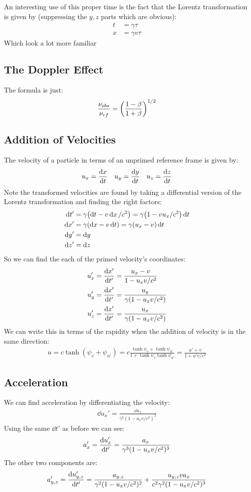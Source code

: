 \documentclass[12pt]{article}
\begin{document}
An interesting use of this proper time is the fact that the Lorentz transformation is given by (suppressing the $y,z$ parts which are obvious):
\begin{align*}
  t&=\gamma\tau\\
  x&=\gamma v\tau
\end{align*}
Which look a lot more familiar
\subsection{The Doppler Effect}
The formula is just:
\begin{align*}
  \frac{\nu_{obs}}{\nu_{rf}}=\qty(\frac{1-\beta}{1+\beta})^{1/2}
\end{align*}
\subsection{Addition of Velocities}
The velocity of a particle in terms of an unprimed reference frame is given by:
\begin{align*}
  u_x=\dv{x}{t}\quad u_y=\dv{y}{t}\quad u_z=\dv{z}{t}
\end{align*}
Note the transformed velocities are found by taking a differential version of the Lorentz transformation and finding the right factors:
\begin{align*}
  \dd{t'}&=\gamma\qty(\dd{t}-v\dd{x}/c^2)=\gamma\qty(1-vu_x/c^2)\dd{t}\\
  \dd{x'}&=\gamma(\dd{x}-v\dd{t})=\gamma\qty(u_x-v)\dd{t}\\
  \dd{y'}&=\dd{y}\\
  \dd{z'}&=\dd{z}
\end{align*}
So we can find the each of the primed velocity's coordinates:
\begin{align*}
  u_x'&=\dv{x'}{t'}=\frac{u_x-v}{1-u_xv/c^2}\\
  u_y'&=\dv{x'}{t'}=\frac{u_y}{\gamma(1-u_xv/c^2)}\\
  u_z'&=\dv{x'}{t'}=\frac{u_x}{\gamma(1-u_xv/c^2)}
\end{align*}
We can write this in terms of the rapidity when the addition of velocity is in the same direction:
\begin{align*}
  u=c\tanh(\psi_v+\psi_{u'})=c\frac{\tanh\psi_v+\tanh\psi_{u'}}{1+\tanh\psi_v\tanh\psi_{u'}}=\frac{u'+v}{1+u'v/c^2}
\end{align*}
\subsection{Acceleration}
We can find acceleration by differentiating the velocity:
\begin{align*}
  \dd{u_x}'=\frac{\dd{u_x}}{\gamma^2(1-u_xv/c^2)^2}
\end{align*}
Using the same $\dd{t'}$ as before we can see:
\begin{align*}
  a'_x=\dv{u'_x}{t'}=\frac{a_x}{\gamma^3(1-u_xv/c^2)^3}
\end{align*}
The other two components are:
\begin{align*}
  a_{y,z}'=\dv{u'_{y,z}}{t'}=\frac{a_{y,z}}{\gamma^2(1-u_xv/c^2)^2}
  +\frac{u_{y,z}va_x}{c^2\gamma^2(1-u_xv/c^2)^3}
\end{align*}
\end{document}
